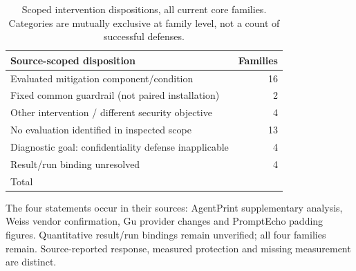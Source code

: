 \begin{table}[t]\centering\footnotesize
\caption{Scoped intervention dispositions, all \FinalCore{} current core families. Categories are mutually exclusive at family level, not a count of successful defenses.}\label{tab:intervention-status}
\begin{tabularx}{\columnwidth}{@{}Yr@{}}\toprule
Source-scoped disposition & Families\\\midrule
Evaluated mitigation component/condition & 16\\
Fixed common guardrail (not paired installation) & 2\\
Other intervention / different security objective & 4\\
No evaluation identified in inspected scope & 13\\
Diagnostic goal: confidentiality defense inapplicable & 4\\
Result/run binding unresolved & 4\\\midrule
Total & \FinalCore{}\\\bottomrule
\end{tabularx}
\par\smallskip\raggedright\footnotesize
The four statements occur in their sources: AgentPrint supplementary analysis, Weiss vendor confirmation, Gu provider changes and PromptEcho padding figures. Quantitative result/run bindings remain unverified; all four families remain. Source-reported response, measured protection and missing measurement are distinct.
\end{table}

